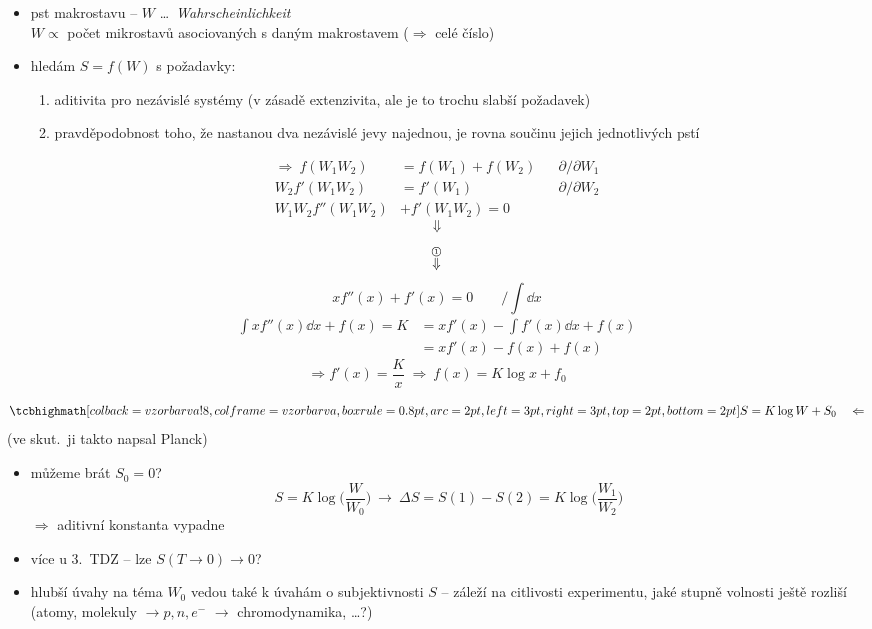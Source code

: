 \begin{itemize}
  \item pst makrostavu -- $W$ \dots\ \emph{Wahrscheinlichkeit} \\
  \quad $W\propto$ počet mikrostavů asociovaných s daným makrostavem ($\Rightarrow$ celé číslo)
\end{itemize}

\begin{itemize}
  \item hledám $S = f(W)$ s požadavky:
  \begin{enumerate}[label=\arabic*)]
    \item aditivita pro nezávislé systémy (v zásadě extenzivita, ale je to trochu slabší požadavek)
    \item pravděpodobnost toho, že nastanou dva nezávislé jevy najednou, je rovna součinu jejich jednotlivých pstí
  \end{enumerate}
\end{itemize}

\begin{minipage}[t]{0.45\textwidth}
\begin{align*}
  \Rightarrow\ f(W_1W_2) &= f(W_1) + f(W_2) && \partial/\partial W_1 \\
  W_2f'(W_1W_2) &= f'(W_1) && \partial/\partial W_2 \\
  W_1W_2f''(W_1W_2) &+ f'(W_1W_2) = 0 &&
\end{align*}
\[ \Downarrow \]
\end{minipage}
\begin{minipage}[t]{0.53\textwidth}\color{NavyBlue}
\vspace{10mm}
\[ \overset{\text{\textcircled{\tiny 1}}}{\Downarrow} \]
\[ xf''(x) + f'(x) = 0 \qquad \Big/\!\!\int\dd x \]
\begin{align*}
  \int xf''(x)\dd x + f(x) = K &= xf'(x) - \int f'(x)\dd x + f(x) \\
  &= xf'(x) - f(x) + f(x)
\end{align*}
\[ \Rightarrow f'(x) = \frac Kx \ \Rightarrow\ f(x) = K\log x + f_0 \]
\end{minipage}

\begin{veta}
\[ \vzorec{S = K\log W} + S_0 \quad\Leftarrow \]
(ve skut.\ ji takto napsal Planck)
\end{veta}
\begin{itemize}
  \item můžeme brát $S_0 = 0$?
  \[ S = K\log\Big(\frac{W}{W_0}\Big) \ \to\ \Delta S = S(1) - S(2) = K\log\Big(\frac{W_1}{W_2}\Big) \]
  \quad $\Rightarrow$ aditivní konstanta vypadne
  \item více u 3.\ TDZ -- lze $S(T\to 0)\to 0$?
  \item hlubší úvahy na téma $W_0$ vedou také k úvahám o subjektivnosti $S$ -- záleží na citlivosti experimentu, jaké stupně volnosti ještě rozliší (atomy, molekuly $\to p, n, e^-$ $\to$ chromodynamika, \dots?)
\end{itemize}

